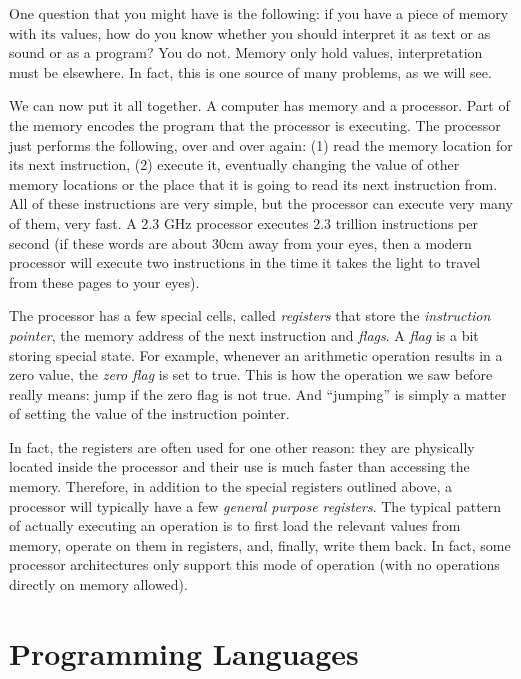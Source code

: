 One question that you might have is the following: if you have a piece of
memory with its values, how do you know whether you should interpret it as text
or as sound or as a program? You do not. Memory only hold values,
interpretation must be elsewhere. In fact, this is one source of many problems,
as we will see.

\medskip

We can now put it all together. A computer has memory and a processor. Part of
the memory encodes the program that the processor is executing. The processor
just performs the following, over and over again: (1) read the memory location
for its next instruction, (2) execute it, eventually changing the value of
other memory locations or the place that it is going to read its next
instruction from. All of these instructions are very simple, but the processor
can execute very many of them, very fast. A 2.3 GHz processor executes 2.3
trillion instructions per second (if these words are about 30cm away from your
eyes, then a modern processor will execute two instructions in the time it
takes the light to travel from these pages to your eyes).

The processor has a few special cells, called \emph{registers} that store the
\emph{instruction pointer}, the memory address of the next instruction and
\emph{flags}. A \emph{flag} is a bit storing special state. For example,
whenever an arithmetic operation results in a zero value, the \emph{zero flag}
is set to true. This is how the  operation we saw before
really means: jump if the zero flag is not true. And ``jumping'' is simply a
matter of setting the value of the instruction pointer.

In fact, the registers are often used for one other reason: they are physically
located inside the processor and their use is much faster than accessing the
memory. Therefore, in addition to the special registers outlined above, a
processor will typically have a few \emph{general purpose registers}. The
typical pattern of actually executing an operation is to first load the
relevant values from memory, operate on them in registers, and, finally, write
them back. In fact, some processor architectures only support this mode of
operation (with no operations directly on memory allowed).

\section{Programming Languages}

